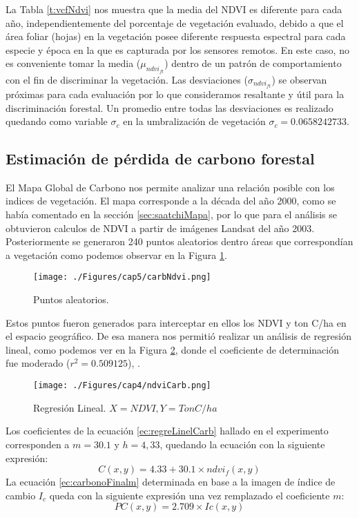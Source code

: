 La Tabla \ref{t:vcfNdvi} nos muestra que la media del NDVI es diferente para cada a\~{n}o, independientemente del porcentaje de vegetaci\'on evaluado, debido a que el \'area foliar (hojas) en la vegetaci\'on posee diferente respuesta espectral para cada especie y \'epoca en la que es capturada por los sensores remotos. En este caso, no es conveniente tomar la media ($  \mu_{ndvi_{ft}} $) dentro de un patr\'on de comportamiento con el fin de discriminar la vegetaci\'on. Las desviaciones ($ \sigma_{ndvi_{ft}} $) se observan pr\'oximas para cada evaluaci\'on por lo que consideramos resaltante y \'util para la discriminaci\'on forestal. Un promedio entre todas las desviaciones es realizado quedando como variable $ \sigma_{c} $ en la umbralizaci\'on de vegetaci\'on  $ \sigma_{c} = 0.0658242733 $.
\subsection{Estimaci\'on de p\'erdida de carbono forestal}\label{subsec:estimacionCarbono}
El Mapa Global de Carbono nos permite analizar una relaci\'on posible con los indices de vegetaci\'on. El mapa corresponde a la d\'ecada del a\~{n}o 2000, como se hab\'ia comentado en la secci\'on \ref{sec:saatchiMapa}, por lo que para el an\'alisis se obtuvieron calculos de NDVI a partir de im\'agenes Landsat del a\~{n}o 2003. Posteriormente se generaron 240 puntos aleatorios dentro \'areas que correspond\'ian a vegetaci\'on como podemos observar en la Figura \ref{fig:aleatorioCrb}.
\begin{figure}[H]
	\centering
	\texttt{[image: ./Figures/cap5/carbNdvi.png]}
	\caption{Puntos aleatorios.}
	\label{fig:aleatorioCrb}
\end{figure}
Estos puntos fueron generados para interceptar en ellos los NDVI y ton C/ha en el espacio geográfico. De esa manera nos permiti\'o realizar un an\'alisis de regresi\'on lineal, como podemos ver en la Figura \ref{fig:linealCar}, donde el coeficiente de determinaci\'on fue moderado ($ r^{2}=0.509125 $), .
\begin{figure}[H]
	\centering
	\texttt{[image: ./Figures/cap4/ndviCarb.png]}
	\caption{Regresi\'on Lineal. $ X=NDVI, Y=TonC/ha $}
	\label{fig:linealCar}
\end{figure}
Los coeficientes de la ecuaci\'on \ref{ec:regreLinelCarb} hallado en el experimento corresponden a $ m=30.1 $ y $ h =4,33 $, quedando la ecuaci\'on con la siguiente expresi\'on:
\begin{equation}\label{ec:regreLinelCarbExp}
C(x,y)=4.33+30.1 \times ndvi_{f}(x,y)
\end{equation}
La ecuaci\'on \ref{ec:carbonoFinalm} determinada en base a la imagen de \'indice de cambio $ I_{c} $ queda con la siguiente expresi\'on una vez remplazado el coeficiente $ m $:
 \begin{equation}\label{ec:carbonoFinalmExp}
 PC(x,y) = 2.709 \times Ic(x,y)
 \end{equation}


